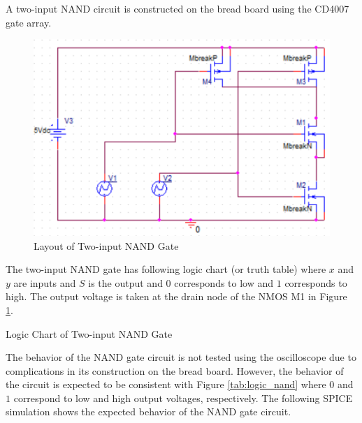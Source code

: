 
A two-input NAND circuit is constructed on the bread board using the CD4007 gate array.

\FloatBarrier

\begin{figure}[h!]
	\centering
	\includegraphics[scale=0.50]{../images/nand_schematic.PNG}
	\caption{Layout of Two-input NAND Gate}
	\label{fig:nand_schematic}
\end{figure}

\FloatBarrier

The two-input NAND gate has following logic chart (or truth table) where $x$ and $y$ are inputs and $S$ is the output and $0$ corresponds to low and $1$ corresponds to high.
The output voltage is taken at the drain node of the NMOS M1 in Figure \ref{fig:nand_schematic}.

\FloatBarrier

\begin{table}[h!]
	\centering
	\caption{Logic Chart of Two-input NAND Gate}
	\label{tab:logic_nand}
\end{table}

\FloatBarrier

The behavior of the NAND gate circuit is not tested using the oscilloscope due to complications in its construction on the bread board.
However, the behavior of the circuit is expected to be consistent with Figure \ref{tab:logic_nand} where $0$ and $1$ correspond to low and high output voltages, respectively.
The following SPICE simulation shows the expected behavior of the NAND gate circuit.

\FloatBarrier

